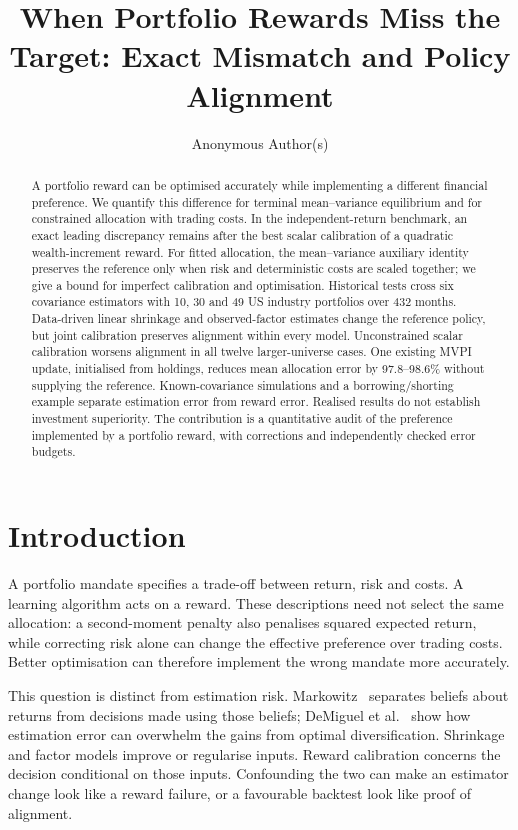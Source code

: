 \documentclass[sigconf,anonymous,review]{acmart}
\title{When Portfolio Rewards Miss the Target: Exact Mismatch and Policy Alignment}
\author{Anonymous Author(s)}
\begin{document}
\begin{abstract}
A portfolio reward can be optimised accurately while implementing a different financial preference. We quantify this difference for terminal mean--variance equilibrium and for constrained allocation with trading costs. In the independent-return benchmark, an exact leading discrepancy remains after the best scalar calibration of a quadratic wealth-increment reward. For fitted allocation, the mean--variance auxiliary identity preserves the reference only when risk and deterministic costs are scaled together; we give a bound for imperfect calibration and optimisation. Historical tests cross six covariance estimators with 10, 30 and 49 US industry portfolios over 432 months. Data-driven linear shrinkage and observed-factor estimates change the reference policy, but joint calibration preserves alignment within every model. Unconstrained scalar calibration worsens alignment in all twelve larger-universe cases. One existing MVPI update, initialised from holdings, reduces mean allocation error by 97.8--98.6\% without supplying the reference. Known-covariance simulations and a borrowing/shorting example separate estimation error from reward error. Realised results do not establish investment superiority. The contribution is a quantitative audit of the preference implemented by a portfolio reward, with corrections and independently checked error budgets.
\end{abstract}
\maketitle

\section{Introduction}
A portfolio mandate specifies a trade-off between return, risk and costs. A learning algorithm acts on a reward. These descriptions need not select the same allocation: a second-moment penalty also penalises squared expected return, while correcting risk alone can change the effective preference over trading costs. Better optimisation can therefore implement the wrong mandate more accurately.

This question is distinct from estimation risk. Markowitz~\cite{markowitz1952} separates beliefs about returns from decisions made using those beliefs; DeMiguel et al.~\cite{demiguel2009} show how estimation error can overwhelm the gains from optimal diversification. Shrinkage and factor models improve or regularise inputs. Reward calibration concerns the decision conditional on those inputs. Confounding the two can make an estimator change look like a reward failure, or a favourable backtest look like proof of alignment.
\end{document}
